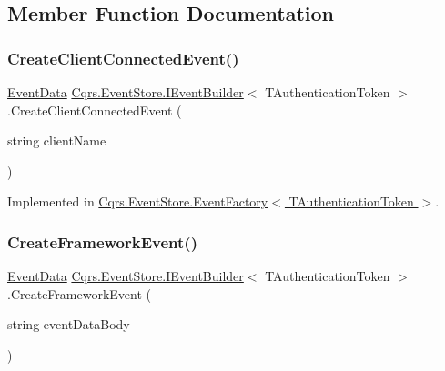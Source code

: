 \subsection{Member Function Documentation}
\mbox{\label{interfaceCqrs_1_1EventStore_1_1IEventBuilder_ae11ead7fa69632041e081e60f51c4e9f}} 
\subsubsection{\texorpdfstring{Create\+Client\+Connected\+Event()}{CreateClientConnectedEvent()}}
{\footnotesize\ttfamily \hyperlink{classCqrs_1_1Events_1_1EventData}{Event\+Data} \hyperlink{interfaceCqrs_1_1EventStore_1_1IEventBuilder}{Cqrs.\+Event\+Store.\+I\+Event\+Builder}$<$ T\+Authentication\+Token $>$.Create\+Client\+Connected\+Event (\begin{DoxyParamCaption}\item[{string}]{client\+Name }\end{DoxyParamCaption})}



Implemented in \hyperlink{classCqrs_1_1EventStore_1_1EventFactory_a237daf998b545d170ab9f30187a0b8e7}{Cqrs.\+Event\+Store.\+Event\+Factory$<$ T\+Authentication\+Token $>$}.

\mbox{\label{interfaceCqrs_1_1EventStore_1_1IEventBuilder_a341d5c54ef8a271a8248e0a5266e6228}} 
\subsubsection{\texorpdfstring{Create\+Framework\+Event()}{CreateFrameworkEvent()}\hspace{0.1cm}{\footnotesize\ttfamily [1/4]}}
{\footnotesize\ttfamily \hyperlink{classCqrs_1_1Events_1_1EventData}{Event\+Data} \hyperlink{interfaceCqrs_1_1EventStore_1_1IEventBuilder}{Cqrs.\+Event\+Store.\+I\+Event\+Builder}$<$ T\+Authentication\+Token $>$.Create\+Framework\+Event (\begin{DoxyParamCaption}\item[{string}]{event\+Data\+Body }\end{DoxyParamCaption})}




